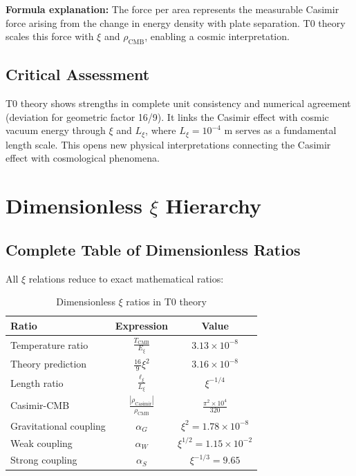 	\textbf{Formula explanation:} The force per area represents the measurable Casimir force arising from the change in energy density with plate separation. T0 theory scales this force with $\xi$ and $\rho_{\text{CMB}}$, enabling a cosmic interpretation.
	
	\subsection{Critical Assessment}
	T0 theory shows strengths in complete unit consistency and numerical agreement (deviation for geometric factor 16/9). It links the Casimir effect with cosmic vacuum energy through $\xi$ and $L_\xi$, where $L_\xi = 10^{-4}$ m serves as a fundamental length scale. This opens new physical interpretations connecting the Casimir effect with cosmological phenomena.
	
	\section{Dimensionless $\xi$ Hierarchy}
	
	\subsection{Complete Table of Dimensionless Ratios}
	
	All $\xi$ relations reduce to exact mathematical ratios:
	
	\begin{table}[htbp]
		\centering
		\caption{Dimensionless $\xi$ ratios in T0 theory}
		\begin{tabular}{lcc}
			\toprule
			\textbf{Ratio} & \textbf{Expression} & \textbf{Value} \\
			\midrule
			Temperature ratio & $\frac{T_{\text{CMB}}}{E_\xi}$ & $3.13 \times 10^{-8}$ \\
			Theory prediction & $\frac{16}{9}\xi^2$ & $3.16 \times 10^{-8}$ \\
			Length ratio & $\frac{\ell_{\xi}}{L_\xi}$ & $\xi^{-1/4}$ \\
			Casimir-CMB & $\frac{|\rho_{\text{Casimir}}|}{\rho_{\text{CMB}}}$ & $\frac{\pi^2 \times 10^4}{320}$ \\
			Gravitational coupling & $\alpha_G$ & $\xi^2 = 1.78 \times 10^{-8}$ \\
			Weak coupling & $\alpha_W$ & $\xi^{1/2} = 1.15 \times 10^{-2}$ \\
			Strong coupling & $\alpha_S$ & $\xi^{-1/3} = 9.65$ \\
			\bottomrule
		\end{tabular}
	\end{table}
	
